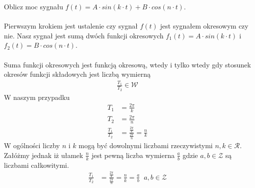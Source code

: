 \begin{task}
Oblicz moc sygnału $f(t)=A\cdot sin\left(k \cdot t\right)+B \cdot cos\left(n \cdot t\right)$.
\\\\
Pierwszym krokiem jest ustalenie czy sygnał $f(t)$ jest sygnałem okresowym czy nie. Nasz sygnał jest sumą dwóch funkcji okresowych $f_{1}(t)=A\cdot sin\left(k\cdot t\right)$ i $f_{2}(t)=B\cdot cos\left(n\cdot t\right)$.
\\\\
Suma funkcji okresowych jest funkcją okresową, wtedy i tylko wtedy gdy stosunek okresów funkcji składowych jest liczbą wymierną 
\begin{align*}
\frac{T_{1}}{T_{2}} \in \mathcal{W}
\end{align*}
W naszym przypadku 
\begin{align*}
T_{1} &= \frac{2\pi}{k}\\
T_{2} &= \frac{2\pi}{n}\\
\frac{T_{1}}{T_{2}} &= \frac{\frac{2\pi}{k}}{\frac{2\pi}{n}} = \frac{n}{k}
\end{align*}
W ogólności liczby $n$ i $k$ mogą być dowolnymi liczbami rzeczywistymi $n, k \in \mathcal{R}$.
Załóżmy jednak iż ułamek $\frac{n}{k}$ jest pewną liczba wymierna $\frac{a}{b}$ gdzie $a,b \in \mathcal{Z}$ są liczbami całkowitymi. 
\begin{align*}
\frac{T_{1}}{T_{2}} &= \frac{\frac{2\pi}{k}}{\frac{2\pi}{n}} = \frac{n}{k} = \frac{a}{b} \;\; a,b \in \mathcal{Z}
\end{align*}


\end{task}
